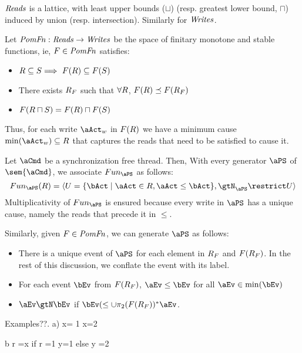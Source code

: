$\mathit{Reads}$ is a lattice, with least upper bounds ($\sqcup$) (resp. greatest lower bound, $\sqcap$)  induced by union (resp. intersection).  Similarly for $\mathit{Writes}$. 

\begin{definition}
Let $\mathit{PomFn}: \mathit{Reads} \rightarrow \mathit{Writes}$ be the space of finitary monotone and stable functions, ie, $F \in \mathit{PomFn}$ satisfies:
\begin{itemize}
\item $R \subseteq S \Longrightarrow\ F(R) \subseteq F(S)$
\item There exists $R_{F}$ such that $\forall R$, $F(R) \preceq F(R_{F})$
\item $F(R \sqcap S) =  F(R) \sqcap F(S)$
\end{itemize}
\end{definition}
Thus, for each write  $\aWrite$ in $F(R)$ we have a minimum cause $\min(\aWrite) \subseteq \aRSet$ that captures the reads that need to be satisfied to cause it.   

Let $\aCmd$ be a synchronization free thread.  Then, 
With every generator $\aPS$ of  $\sem{\aCmd}$, we associate $\pomf{\aPS}$ as follows:
\[ \pomf{\aPS}(\aRSet) = \langle \aWSet = \{ \bAct \mid \aAct \in \aRSet, \aAct \le \bAct \}, \gtN_{\aPS} \restrict \aWSet \rangle \]
Multiplicativity  of $\pomf{\aPS}$ is ensured because every write in $\aPS$ has a unique cause, namely the reads that precede it in $\le$.

Similarly, given $F \in \mathit{PomFn}$, we can generate $\aPS$ as follows:
\begin{itemize}
\item There is a unique event of $\aPS$ for each element in $R_{F}$ and $F(R_{F})$.  In the rest of this discussion, we conflate the event with its label.
\item For each event $\bEv$ from $F(R_{F})$, $\aEv \le \bEv$ for all $\aEv \in \min(\bEv)$
\item $\aEv \gtN \bEv$ if $ \bEv (\le \cup \pi_2(\aFn(\aRSet_{\aFn}))^* \aEv$.
\end{itemize}

Examples??.  
a) x= 1
x=2

b  r =x
   if r =1  {y=1}
   else      {y =2}


